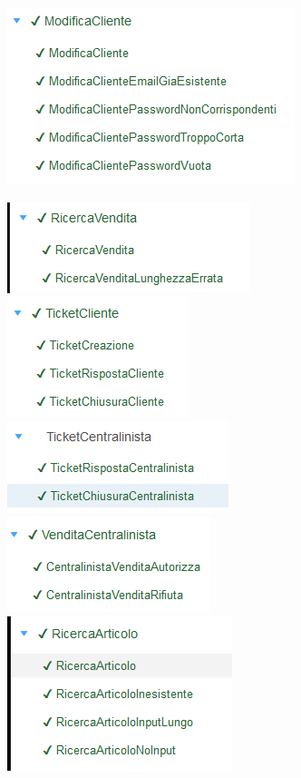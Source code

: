 \documentclass[12pt]{article}
\begin{document}
\begin{multicols}{2}
 
\includegraphics[scale=0.45]{modificacliente} \\

\columnbreak


\includegraphics[scale=0.45]{ricercavendita} \\


\includegraphics[scale=0.45]{ticketcliente} \\


\includegraphics[scale=0.45]{ticketcentralinista} \\


\includegraphics[scale=0.45]{venditacentralinista} \\

\includegraphics[scale=0.45]{ricercaarticolo} \\


\end{multicols}
\end{document}
